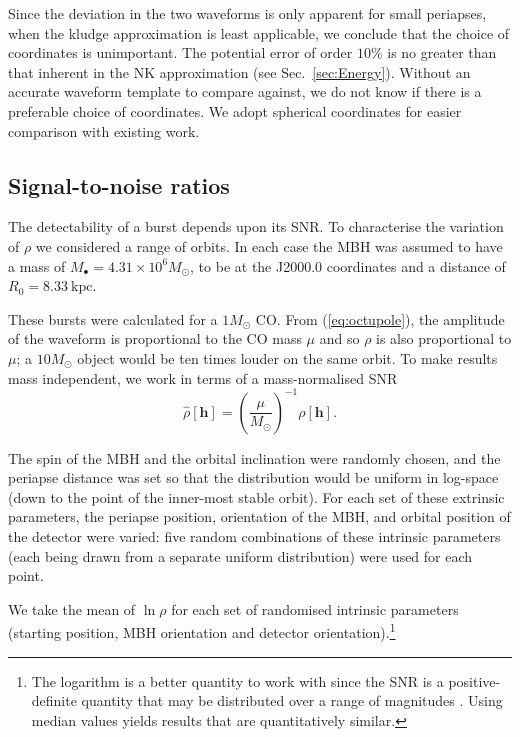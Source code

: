 \documentclass[useAMS,usedcolumn,usegraphicx,usenatbib]{mn2e}
\newcommand{\eqnref}[1]{(\ref{eq:#1})}
\newcommand{\secref}[1]{Sec.~\ref{sec:#1}}
\begin{document}
Since the deviation in the two waveforms is only apparent for small periapses, when the kludge approximation is least applicable, we conclude that the choice of coordinates is unimportant. The potential error of order $10\%$ is no greater than that inherent in the NK approximation (see \secref{Energy}). Without an accurate waveform template to compare against, we do not know if there is a preferable choice of coordinates. We adopt spherical coordinates for easier comparison with existing work.

\subsection{Signal-to-noise ratios}

The detectability of a burst depends upon its SNR. To characterise the variation of $\rho$ we considered a range of orbits. In each case the MBH was assumed to have a mass of $M_\bullet = 4.31 \times 10^6 M_\odot$, to be at the J2000.0 coordinates and a distance of $R_0 = 8.33~\mathrm{kpc}$.

These bursts were calculated for a $1 M_\odot$ CO. From \eqnref{octupole}, the amplitude of the waveform is proportional to the CO mass $\mu$ and so $\rho$ is also proportional to $\mu$; a $10 M_\odot$ object would be ten times louder on the same orbit. To make results mass independent, we work in terms of a mass-normalised SNR
\begin{equation}
\hat{\rho}[\boldsymbol{h}] = \left(\frac{\mu}{M_\odot}\right)^{-1}\rho[\boldsymbol{h}].
\end{equation}

The spin of the MBH and the orbital inclination were randomly chosen, and the periapse distance was set so that the distribution would be uniform in log-space (down to the point of the inner-most stable orbit). For each set of these extrinsic parameters, the periapse position, orientation of the MBH, and orbital position of the detector were varied: five random combinations of these intrinsic parameters (each being drawn from a separate uniform distribution) were used for each point.

We take the mean of $\ln \rho$ for each set of randomised intrinsic parameters (starting position, MBH orientation and detector orientation).\footnote{The logarithm is a better quantity to work with since the SNR is a positive-definite quantity that may be distributed over a range of magnitudes \citep[sections 22.1, 23.3]{MacKay2003}. Using median values yields results that are quantitatively similar.}
\end{document}
